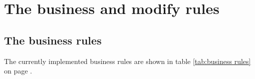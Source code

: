  \newenvironment{lyxcode}
    {\begin{list}{}{
                           \setlength{\rightmargin}{\leftmargin}
                                \setlength{\listparindent}{0pt}%
                                   AMS classes
                                        \raggedright
                                             \setlength{\itemsep}{0pt}
                                     \setlength{\parsep}{0pt}
                                          \normalfont\ttfamily}%
                                                 \item[]}
                                                    {\end{list}}

\chapter{The business and modify rules}


\section{The business rules}

The currently implemented business rules are shown in table \ref{tab:business rules}
on page \pageref{tab:business rules}.

